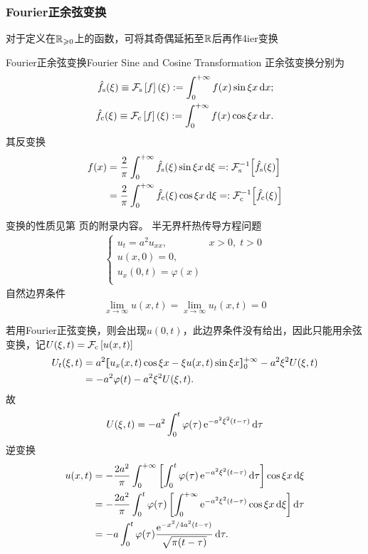 \subsubsection{Fourier正余弦变换}
对于定义在$\RR_{\geqslant  0}$上的函数，可将其奇偶延拓至$\RR$后再作4ier变换
\begin{definition}{Fourier正余弦变换}{Fourier Sine and Cosine Transformation}
	正余弦变换分别为
	\begin{align*}
		\hat f_\sine(\xi)\equiv\cf[s]f(\xi):=\int\zti f(x)\sin\xi x\d x;\\
		\hat f_\cosi(\xi)\equiv\cf[c]f(\xi):=\int\zti f(x)\cos\xi x\d x.
	\end{align*}
	其反变换
	\begin{align*}
		f(x)&=\frac2\pi\int\zti\hat f_\sine(\xi)\sin\xi x\d\xi=:\cfi[s]{\hat f_\sine(\xi)}\\
		&=\frac2\pi\int\zti\hat f_\cosi(\xi)\cos\xi x\d\xi=:\cfi[c]{\hat f_\cosi(\xi)}
	\end{align*}
\end{definition}
变换的性质见第 \pageref{The Property of Sine and Cosine Transformation} 页的附录内容。
\eg 半无界杆热传导方程问题
\begin{align*}
	\begin{cases}
		u_t=a^2u_{xx},&x>0,\;t>0\\
		u(x,0)=0,\\
		u_x(0,t)=\varphi(x)\\
	\end{cases}
\end{align*}
自然边界条件
\[\lim_{x\to\infty}u(x,t)=\lim_{x\to\infty}u_t(x,t)=0\]

若用Fourier正弦变换，则会出现$u(0,t)$，此边界条件没有给出，因此只能用余弦变换，记$U(\xi,t)=\cf[c]{u(x,t)}$
\begin{align*}
	U_t(\xi,t)&=a^2\zkh{u_x(x,t)\cos\xi x-\xi u(x,t)\sin\xi x}\zti-a^2\xi^2U(\xi,t)\\
	&=-a^2\varphi(t)-a^2\xi^2U(\xi,t).
\end{align*}
故
\[U(\xi,t)=-a^2\int_0^t\varphi(\tau)\e{-a^2\xi^2(t-\tau)}\d\tau\]
逆变换
\begin{align*}
	u(x,t)&=-\frac{2a^2}\pi\int\zti\fkh{\int_0^t\varphi(\tau)\e{-a^2\xi^2(t-\tau)}\d\tau}\cos\xi x\d\xi\\
	&=-\frac{2a^2}\pi\int_0^t\varphi(\tau)\fkh{\int\zti\e{-a^2\xi^2(t-\tau)}\cos\xi x\d\xi}\d\tau\\
	&=-a\int_0^t\varphi(\tau)\frac{\e{-x^2/4a^2(t-\tau)}}{\sqrt{\pi(t-\tau)}}\d\tau.
\end{align*}

